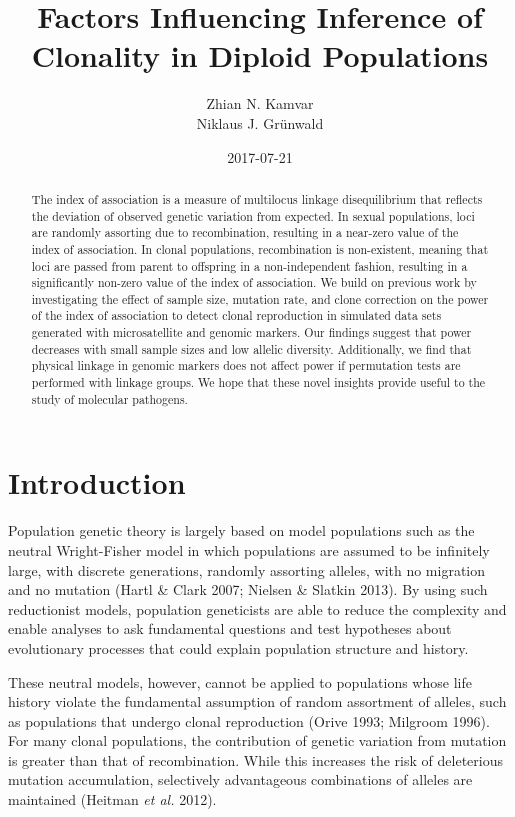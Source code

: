 \documentclass[]{article}
\title{Factors Influencing Inference of Clonality in Diploid Populations}
\author{Zhian N. Kamvar \\ Niklaus J. Grünwald}
\date{2017-07-21}
\theoremstyle{definition}
\theoremstyle{definition}
\theoremstyle{remark}
\begin{document}
\maketitle
\begin{abstract}
The index of association is a measure of multilocus linkage
disequilibrium that reflects the deviation of observed genetic variation
from expected. In sexual populations, loci are randomly assorting due to
recombination, resulting in a near-zero value of the index of
association. In clonal populations, recombination is non-existent,
meaning that loci are passed from parent to offspring in a
non-independent fashion, resulting in a significantly non-zero value of
the index of association. We build on previous work by investigating the
effect of sample size, mutation rate, and clone correction on the power
of the index of association to detect clonal reproduction in simulated
data sets generated with microsatellite and genomic markers. Our
findings suggest that power decreases with small sample sizes and low
allelic diversity. Additionally, we find that physical linkage in
genomic markers does not affect power if permutation tests are performed
with linkage groups. We hope that these novel insights provide useful to
the study of molecular pathogens.
\end{abstract}

\section{Introduction}\label{introduction}

Population genetic theory is largely based on model populations such as
the neutral Wright-Fisher model in which populations are assumed to be
infinitely large, with discrete generations, randomly assorting alleles,
with no migration and no mutation (Hartl \& Clark 2007; Nielsen \&
Slatkin 2013). By using such reductionist models, population geneticists
are able to reduce the complexity and enable analyses to ask fundamental
questions and test hypotheses about evolutionary processes that could
explain population structure and history.

These neutral models, however, cannot be applied to populations whose
life history violate the fundamental assumption of random assortment of
alleles, such as populations that undergo clonal reproduction (Orive
1993; Milgroom 1996). For many clonal populations, the contribution of
genetic variation from mutation is greater than that of recombination.
While this increases the risk of deleterious mutation accumulation,
selectively advantageous combinations of alleles are maintained (Heitman
\emph{et al.} 2012).
\end{document}
